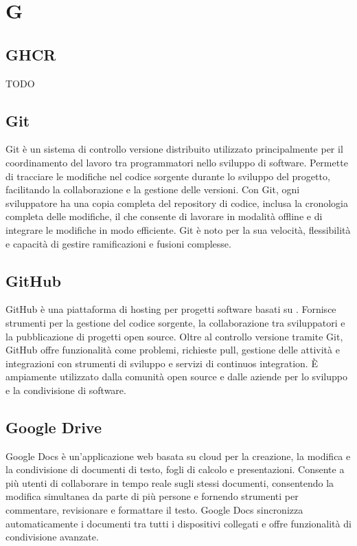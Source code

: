 \section{G}

\vspace{2em}
\subsection*{GHCR}
TODO

\vspace{2em}
\subsection*{Git}
Git è un sistema di controllo versione distribuito utilizzato principalmente per il coordinamento del lavoro tra programmatori nello sviluppo di software. Permette di tracciare le modifiche nel codice sorgente durante lo sviluppo del progetto, facilitando la collaborazione e la gestione delle versioni. Con Git, ogni sviluppatore ha una copia completa del repository di codice, inclusa la cronologia completa delle modifiche, il che consente di lavorare in modalità offline e di integrare le modifiche in modo efficiente. Git è noto per la sua velocità, flessibilità e capacità di gestire ramificazioni e fusioni complesse.


\vspace{2em}
\subsection*{GitHub}
GitHub è una piattaforma di hosting per progetti software basati su . Fornisce strumenti per la gestione del codice sorgente, la collaborazione tra sviluppatori e la pubblicazione di progetti open source. Oltre al controllo versione tramite Git, GitHub offre funzionalità come problemi, richieste pull, gestione delle attività e integrazioni con strumenti di sviluppo e servizi di continuos integration. È ampiamente utilizzato dalla comunità open source e dalle aziende per lo sviluppo e la condivisione di software.

\vspace{2em}
\subsection*{Google Drive}
Google Docs è un'applicazione web basata su cloud per la creazione, la modifica e la condivisione di documenti di testo, fogli di calcolo e presentazioni. Consente a più utenti di collaborare in tempo reale sugli stessi documenti, consentendo la modifica simultanea da parte di più persone e fornendo strumenti per commentare, revisionare e formattare il testo. Google Docs sincronizza automaticamente i documenti tra tutti i dispositivi collegati e offre funzionalità di condivisione avanzate.

